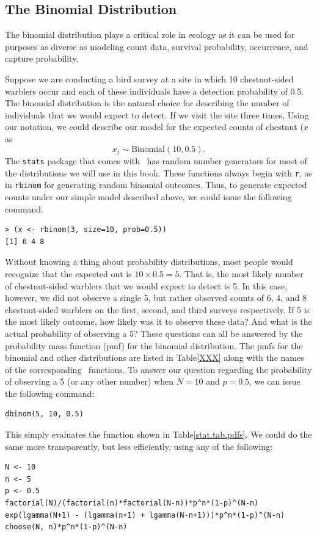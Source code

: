 \subsection{The Binomial Distribution}

The binomial distribution plays a critical role
in ecology as it can be
used for purposes as diverse as modeling count data, survival
probability, occurrence, and capture probability.


Suppose we are conducting a bird survey at a site in which 10 chestnut-sided warblers occur and
each of these individuals have a detection probability of 0.5. The
binomial distribution is the natural choice for describing the number
of individuals that we would expect to detect. If we visit the site
three times, Using our notation, we
could describe our model for the expected counts of chestnut ($x$ as
\[
x_j \sim \text{Binomial}(10, 0.5).
\]
The \texttt{stats} package that comes with \R~has random number
generators for most of the distributions we will use in this
book. These functions always begin with \texttt{r}, as in
\texttt{rbinom} for generating random binomial outcomes. Thus, to
generate expected counts under our simple model described above, we
could issue the following command.

\begin{verbatim}
> (x <- rbinom(3, size=10, prob=0.5))
[1] 6 4 8
\end{verbatim}

Without knowing a thing about probability distributions, most people
would recognize that the expected out is $10 \times 0.5 = 5$. That is,
the most likely number of chestnut-sided warblers that we would expect
to detect is 5. In this case, however, we did not observe a single 5,
but rather observed counts of 6, 4, and 8 chestnut-sided
warblers on the first, second, and third surveys
respectively. If 5 is the most likely outcome, how likely was it to
observe these data? And what is the actual probability of observing a
5? These questions can all be answered by the probability mass
function (pmf) for the binomial distribution. The pmfs for the binomial
and other distributions are listed in
Table\ref{XXX} along with the names of the corresponding
\R~functions. To answer our question regarding the probability of
observing a 5 (or any other number) when $N=10$ and $p=0.5$, we can
issue the following command:
\begin{verbatim}
dbinom(5, 10, 0.5)
\end{verbatim}
This simply evaluates the function shown in
Table\ref{stat.tab.pdfs}. We could do the same more transparently, but
less efficiently, using any of the following:
\begin{verbatim}
N <- 10
n <- 5
p <- 0.5
factorial(N)/(factorial(n)*factorial(N-n))*p^n*(1-p)^(N-n)
exp(lgamma(N+1) - (lgamma(n+1) + lgamma(N-n+1)))*p^n*(1-p)^(N-n)
choose(N, n)*p^n*(1-p)^(N-n)
\end{verbatim}

